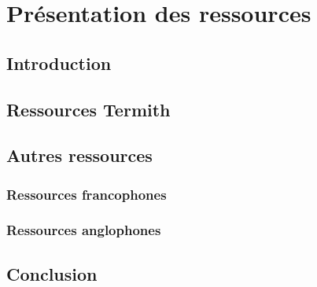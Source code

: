 \chapter{Présentation des ressources}
\label{chap:main-data_description}
  \section{Introduction}
  \label{sec:main-data_description-introduction}


  \section{Ressources Termith}
  \label{sec:main-data_description-termith_data}


  \section{Autres ressources}
  \label{sec:main-data_description-other_data}
    \subsection{Ressources francophones}
    \label{subsec:main-data_description-other_data-french_data}

    \subsection{Ressources anglophones}
    \label{subsec:main-data_description-other_data-english_data}


  \section{Conclusion}
  \label{sec:main-data_description-conclusion}

